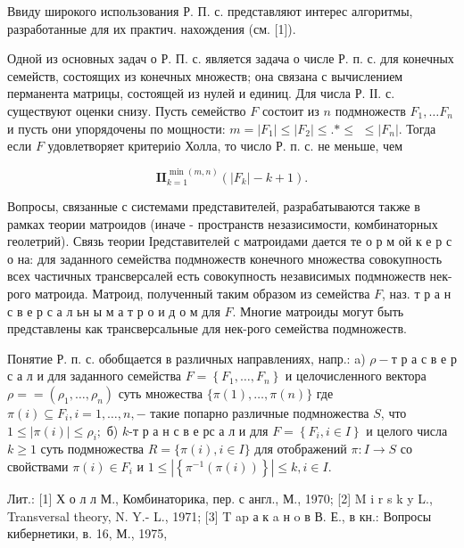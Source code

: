 \documentclass[10pt]{article}
\begin{document}
Ввиду широкого использования Р. П. с. представляют интерес алгоритмы, разработанные для их практич. нахождения (см. [1]).



Одной из основных задач о Р. П. с. является задача о числе Р. п. с. для конечных семейств, состоящих из конечных множеств; она связана с вычислением перманента матрицы, состоящей из нулей и единиц. Для числа Р. ІІ. с. существуют оценки снизу. Пусть семейство $F$ состоит из $n$ подмножеств $F_{1}, \ldots F_{n}$ и пусть они упорядочены по мощности: $m=\left|F_{1}\right| \leqslant\left|F_{2}\right| \leqslant . * \leqslant$ $\leqslant\left|F_{n}\right|$. Тогда если $F$ удовлетворяет критериіо Холла, то число Р. п. с. не меньше, чем



\[

\mathbf{I I}_{k=1}^{\min (m, n)}\left(\left|F_{k}\right|-k+1\right) .

\]



Вопросы, связанные с системами представителей, разрабатываются также в рамках теории матроидов (иначе - пространств незазисимости, комбинаторных геолетрий). Связь теории Іредставителей с матроидами дается те о р м ой к е р с о на: для заданного семейства подмножеств конечного множества совокупность всех частичных трансверсалей есть совокупность независимых подмножеств нек-рого матроида. Матроид, полученный таким образом из семейства $F$, наз. т р а н с в е р с а л ьн ы м а т р о и д о м для $F$. Многие матроиды могут быть представлены как трансверсальные для нек-рого семейства подмножеств.



Понятие Р. п. с. обобщается в различных направлениях, напр.: a) $\rho-т$ р а с в е р с а л и для заданного семейства $F=\left\{F_{1}, \ldots, F_{n}\right\}$ и целочисленного вектора $\rho==\left(\rho_{1}, \ldots, \rho_{n}\right)$ суть множества $\{\pi(1), \ldots, \pi(n)\}$ где $\pi(i) \subseteq F_{i}, i=1, \ldots, n,-$ такие попарно различные подмножества $S$, что $1 \leqslant|\pi(i)| \leqslant \rho_{i} ;$ б) $k$-т р а н с в е рс а л и для $F=\left\{F_{i}, i \in I\right\}$ и целого числа $k \geqslant 1$ суть подмножества $R=\{\pi(i), i \in I\}$ для отображений $\pi: I \rightarrow S$ со свойствами $\pi(i) \in F_{i}$ и $1 \leqslant\left|\left\{\pi^{-1}(\pi(i))\right\}\right| \leqslant k, i \in I$.



Лит.: [1] Х о л л М., Комбинаторика, пер. с англ., М., 1970; [2] M i r s k y L., Transversal theory, N. Y.- L., 1971; [3] T ap а к a н o в В. Е., в кн.: Вопросы кибернетики, в. 16, М., 1975,
\end{document}
